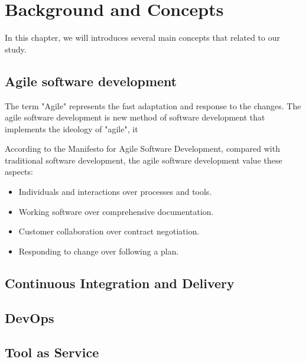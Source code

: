 \chapter{Background and Concepts}
In this chapter, we will introduces several main concepts that related to our study.
\section{Agile software development}
The term "Agile" represents the fast adaptation and response to the changes.\cite{WhatisAg98:online}
The agile software development is new method of software development that implements the ideology of "agile", it 

According to the  Manifesto for Agile Software Development, compared with traditional software development, the agile software development value these aspects: \cite{beck2001manifesto}
\begin{itemize}
\item Individuals and interactions over processes and tools.
\item Working software over comprehensive documentation.
\item Customer collaboration over contract negotiation.
\item Responding to change over following a plan.
\end{itemize}
\section{Continuous Integration and Delivery}
\section{DevOps}
\section{Tool as Service}
